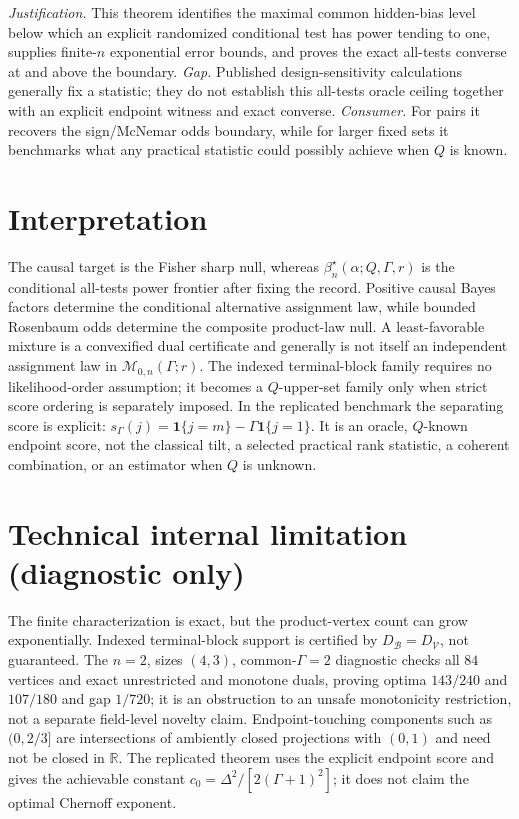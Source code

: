\documentclass{article}
\begin{document}
\par\smallskip\noindent \textit{Justification.} This theorem identifies the maximal common hidden-bias level below which an explicit randomized conditional test has power tending to one, supplies finite-\(n\) exponential error bounds, and proves the exact all-tests converse at and above the boundary. \textit{Gap.} Published design-sensitivity calculations generally fix a statistic; they do not establish this all-tests oracle ceiling together with an explicit endpoint witness and exact converse. \textit{Consumer.} For pairs it recovers the sign/McNemar odds boundary, while for larger fixed sets it benchmarks what any practical statistic could possibly achieve when \(Q\) is known.

\section{Interpretation}

The causal target is the Fisher sharp null, whereas \(\beta_n^\star(\alpha;Q,\Gamma,r)\) is the conditional all-tests power frontier after fixing the record. Positive causal Bayes factors determine the conditional alternative assignment law, while bounded Rosenbaum odds determine the composite product-law null. A least-favorable mixture is a convexified dual certificate and generally is not itself an independent assignment law in \(\mathcal M_{0,n}(\Gamma;r)\). The indexed terminal-block family requires no likelihood-order assumption; it becomes a \(Q\)-upper-set family only when strict score ordering is separately imposed. In the replicated benchmark the separating score is explicit: \(s_\Gamma(j)=\mathbf1\{j=m\}-\Gamma\mathbf1\{j=1\}\). It is an oracle, \(Q\)-known endpoint score, not the classical tilt, a selected practical rank statistic, a coherent combination, or an estimator when \(Q\) is unknown.

\section*{Technical internal limitation (diagnostic only)}

The finite characterization is exact, but the product-vertex count can grow exponentially. Indexed terminal-block support is certified by \(D_{\mathcal B}=D_{\mathcal V}\), not guaranteed. The \(n=2\), sizes \((4,3)\), common-\(\Gamma=2\) diagnostic checks all \(84\) vertices and exact unrestricted and monotone duals, proving optima \(143/240\) and \(107/180\) and gap \(1/720\); it is an obstruction to an unsafe monotonicity restriction, not a separate field-level novelty claim. Endpoint-touching components such as \((0,2/3]\) are intersections of ambiently closed projections with \((0,1)\) and need not be closed in \(\mathbb R\). The replicated theorem uses the explicit endpoint score and gives the achievable constant \(c_0=\Delta^2/[2(\Gamma+1)^2]\); it does not claim the optimal Chernoff exponent.
\end{document}
